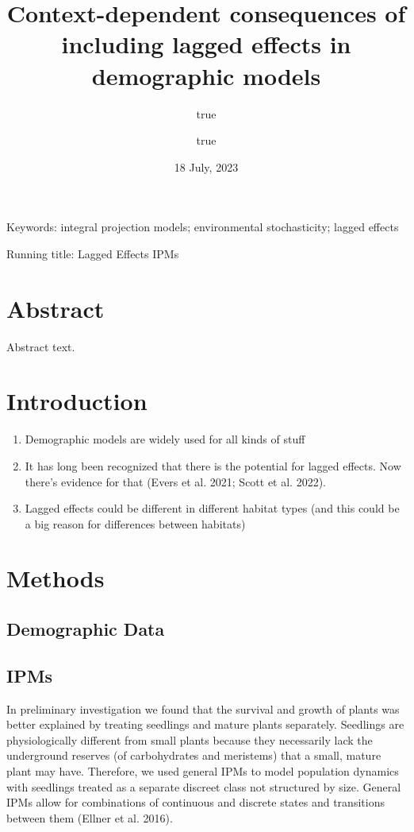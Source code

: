\documentclass[
]{article}
\title{Context-dependent consequences of including lagged effects in demographic models}
\author{true \and true}
\date{18 July, 2023}
\begin{document}
\maketitle

Keywords: integral projection models; environmental stochasticity; lagged effects

Running title: Lagged Effects IPMs

\pagebreak

\hypertarget{abstract}{%
\section{Abstract}\label{abstract}}

Abstract text.

\pagebreak

\hypertarget{introduction}{%
\section{Introduction}\label{introduction}}

\begin{enumerate}
\def\labelenumi{\arabic{enumi}.}
\item
  Demographic models are widely used for all kinds of stuff
\item
  It has long been recognized that there is the potential for lagged effects.
  Now there's evidence for that (Evers et al. 2021; Scott et al. 2022).
\item
  Lagged effects could be different in different habitat types (and this could be a big reason for differences between habitats)
\end{enumerate}

\hypertarget{methods}{%
\section{Methods}\label{methods}}

\hypertarget{demographic-data}{%
\subsection{Demographic Data}\label{demographic-data}}

\hypertarget{ipms}{%
\subsection{IPMs}\label{ipms}}

In preliminary investigation we found that the survival and growth of plants was better explained by treating seedlings and mature plants separately.
Seedlings are physiologically different from small plants because they necessarily lack the underground reserves (of carbohydrates and meristems) that a small, mature plant may have.
Therefore, we used general IPMs to model population dynamics with seedlings treated as a separate discreet class not structured by size.
General IPMs allow for combinations of continuous and discrete states and transitions between them (Ellner et al. 2016).
\end{document}
